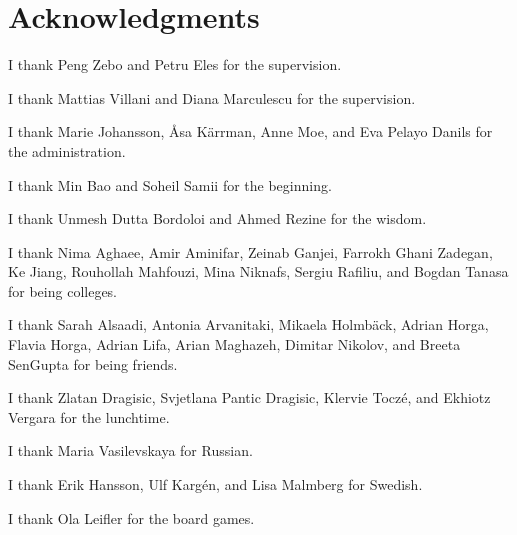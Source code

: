 \chapter*{Acknowledgments}
\newcommand\person[2]{#2 #1}

I thank
\person{Zebo}{Peng} and
\person{Eles}{Petru}
for the supervision.

I thank
\person{Villani}{Mattias} and
\person{Marculescu}{Diana}
for the supervision.

I thank
\person{Johansson}{Marie},
\person{Kärrman}{Åsa},
\person{Moe}{Anne}, and
\person{Pelayo Danils}{Eva}
for the administration.

I thank
\person{Bao}{Min} and
\person{Samii}{Soheil}
for the beginning.

I thank
\person{Dutta Bordoloi}{Unmesh} and
\person{Rezine}{Ahmed}
for the wisdom.

I thank
\person{Aghaee}{Nima},
\person{Aminifar}{Amir},
\person{Ganjei}{Zeinab},
\person{Ghani Zadegan}{Farrokh},
\person{Jiang}{Ke},
\person{Mahfouzi}{Rouhollah},
\person{Niknafs}{Mina},
\person{Rafiliu}{Sergiu}, and
\person{Tanasa}{Bogdan}
for being colleges.

I thank
\person{Alsaadi}{Sarah},
\person{Arvanitaki}{Antonia},
\person{Holmbäck}{Mikaela},
\person{Horga}{Adrian},
\person{Horga}{Flavia},
\person{Lifa}{Adrian},
\person{Maghazeh}{Arian},
\person{Nikolov}{Dimitar}, and
\person{SenGupta}{Breeta}
for being friends.

I thank
\person{Dragisic}{Zlatan},
\person{Pantic Dragisic}{Svjetlana},
\person{Toczé}{Klervie}, and
\person{Vergara}{Ekhiotz}
for the lunchtime.

I thank
\person{Vasilevskaya}{Maria}
for Russian.

I thank
\person{Hansson}{Erik},
\person{Kargén}{Ulf}, and
\person{Malmberg}{Lisa}
for Swedish.

I thank
\person{Leifler}{Ola}
for the board games.
